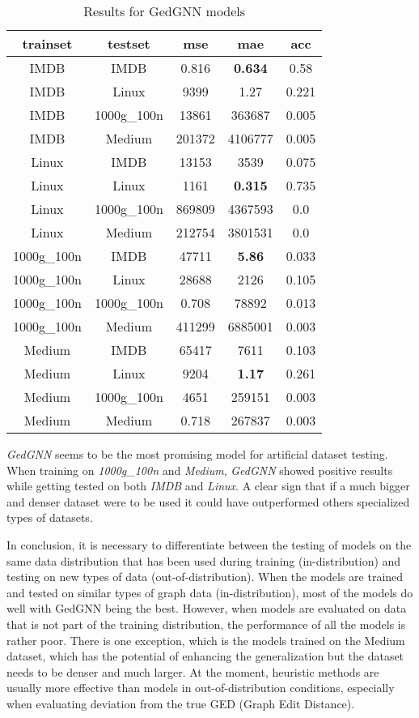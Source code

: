 \documentclass[../Thesis.tex]{subfiles}
\begin{document}
	\begin{table}[H]
		\centering
		\setlength\tabcolsep{4pt}
		\renewcommand{\arraystretch}{1.2}
		\begin{tabular}{c|c|c|c|c}
			\toprule
			\textbf{trainset} & \textbf{testset} & \textbf{mse} & \textbf{mae} & \textbf{acc} \\
			\midrule
			IMDB & IMDB & 0.816 & \textbf{0.634} & 0.58 \\
			IMDB & Linux & 9399 & 1.27 & 0.221 \\
			IMDB & 1000g\_100n & 13861 & 363687 & 0.005 \\
			IMDB & Medium & 201372 & 4106777 & 0.005 \\ \midrule
			Linux & IMDB & 13153 & 3539 & 0.075 \\
			Linux & Linux & 1161 & \textbf{0.315} & 0.735 \\
			Linux & 1000g\_100n & 869809 & 4367593 & 0.0 \\
			Linux & Medium & 212754 & 3801531 & 0.0 \\ \midrule
			1000g\_100n & IMDB & 47711 & \textbf{5.86} & 0.033 \\
			1000g\_100n & Linux & 28688 & 2126 & 0.105 \\
			1000g\_100n & 1000g\_100n & 0.708 & 78892 & 0.013 \\
			1000g\_100n & Medium & 411299 & 6885001 & 0.003 \\ \midrule
			Medium & IMDB & 65417 & 7611 & 0.103 \\
			Medium & Linux & 9204 & \textbf{1.17} & 0.261 \\
			Medium & 1000g\_100n & 4651 & 259151 & 0.003 \\
			Medium & Medium & 0.718 & 267837 & 0.003 \\
			\bottomrule
		\end{tabular}
		\caption{Results for GedGNN models}
		\label{table:gedgnn}
	\end{table}	
	
	\emph{GedGNN} seems to be the most promising model for artificial dataset testing. When training on \emph{1000g\_100n} and \emph{Medium}, \emph{GedGNN} showed positive results while getting tested on both \emph{IMDB} and \emph{Linux}. A clear sign that if a much bigger and denser dataset were to be used it could have outperformed others specialized types of datasets.
	
	In conclusion, it is necessary to differentiate between the testing of models on the same data distribution that has been used during training (in-distribution) and testing on new types of data (out-of-distribution). When the models are trained and tested on similar types of graph data (in-distribution), most of the models do well with GedGNN being the best. However, when models are evaluated on data that is not part of the training distribution, the performance of all the models is rather poor. There is one exception, which is the models trained on the Medium dataset, which has the potential of enhancing the generalization but the dataset needs to be denser and much larger. At the moment, heuristic methods are usually more effective than models in out-of-distribution conditions, especially when evaluating deviation from the true GED (Graph Edit Distance).
	
\end{document}
